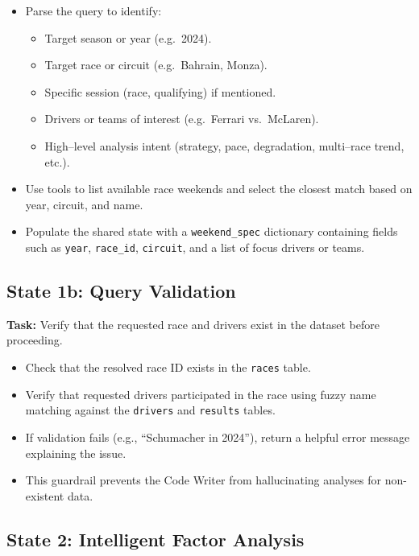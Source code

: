 \documentclass[11pt]{article}
\begin{document}
\begin{itemize}[leftmargin=1.5em]
    \item Parse the query to identify:
    \begin{itemize}
        \item Target season or year (e.g.\ 2024).
        \item Target race or circuit (e.g.\ Bahrain, Monza).
        \item Specific session (race, qualifying) if mentioned.
        \item Drivers or teams of interest (e.g.\ Ferrari vs.\ McLaren).
        \item High–level analysis intent (strategy, pace, degradation, multi–race trend, etc.).
    \end{itemize}
    \item Use tools to list available race weekends and select the closest match based on year, circuit, and name.
    \item Populate the shared state with a \texttt{weekend\_spec} dictionary containing fields such as \texttt{year}, \texttt{race\_id}, \texttt{circuit}, and a list of focus drivers or teams.
\end{itemize}

\subsection*{State 1b: Query Validation}

\textbf{Task:} Verify that the requested race and drivers exist in the dataset before proceeding.

\begin{itemize}[leftmargin=1.5em]
    \item Check that the resolved race ID exists in the \texttt{races} table.
    \item Verify that requested drivers participated in the race using fuzzy name matching against the \texttt{drivers} and \texttt{results} tables.
    \item If validation fails (e.g., ``Schumacher in 2024''), return a helpful error message explaining the issue.
    \item This guardrail prevents the Code Writer from hallucinating analyses for non-existent data.
\end{itemize}

\subsection*{State 2: Intelligent Factor Analysis}
\end{document}
